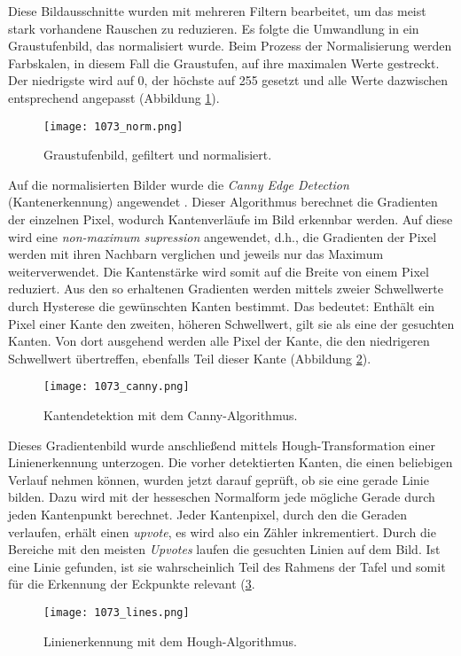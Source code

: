 Diese Bildausschnitte wurden mit mehreren Filtern bearbeitet, um das meist stark vorhandene Rauschen zu reduzieren. Es folgte die Umwandlung in ein Graustufenbild, das normalisiert wurde. Beim Prozess der Normalisierung werden Farbskalen, in diesem Fall die Graustufen, auf ihre maximalen Werte gestreckt. Der niedrigste wird auf 0, der höchste auf 255 gesetzt und alle Werte dazwischen entsprechend angepasst (Abbildung \ref{fig:norm}).

\begin{figure}[h!]
\centering
\texttt{[image: 1073\_norm.png]}
\caption{Graustufenbild, gefiltert und normalisiert.}
\label{fig:norm}
\end{figure}

Auf die normalisierten Bilder wurde die \textit{Canny Edge Detection} (Kantenerkennung) angewendet \cite{cannyedge}. Dieser Algorithmus berechnet die Gradienten der einzelnen Pixel, wodurch Kantenverläufe im Bild erkennbar werden. Auf diese wird eine \textit{non-maximum supression} angewendet, d.h., die Gradienten der Pixel werden mit ihren Nachbarn verglichen und jeweils nur das Maximum weiterverwendet. Die Kantenstärke wird somit auf die Breite von einem Pixel reduziert. Aus den so erhaltenen Gradienten werden mittels zweier Schwellwerte durch Hysterese die gewünschten Kanten bestimmt. Das bedeutet:  Enthält ein Pixel einer Kante den zweiten, höheren Schwellwert, gilt sie als eine der gesuchten Kanten. Von dort ausgehend werden alle Pixel der Kante, die den niedrigeren Schwellwert übertreffen, ebenfalls Teil dieser Kante (Abbildung \ref{fig:canny}).
\begin{figure}[h!]
\centering
\texttt{[image: 1073\_canny.png]}
\caption{Kantendetektion mit dem Canny-Algorithmus.}
\label{fig:canny}
\end{figure}

Dieses Gradientenbild wurde anschließend mittels Hough-Transformation \cite{houghpatent}{} einer Linienerkennung unterzogen. Die vorher detektierten Kanten, die einen beliebigen Verlauf nehmen können, wurden jetzt darauf geprüft, ob sie eine gerade Linie bilden. Dazu wird mit der hesseschen Normalform jede mögliche Gerade durch jeden Kantenpunkt berechnet. Jeder Kantenpixel, durch den die Geraden verlaufen, erhält einen \textit{upvote}, es wird also ein Zähler inkrementiert. Durch die Bereiche mit den meisten \textit{Upvotes} laufen die gesuchten Linien auf dem Bild. Ist eine Linie gefunden, ist sie wahrscheinlich Teil des Rahmens der Tafel und somit für die Erkennung der Eckpunkte relevant (\ref{fig:lines}.
\begin{figure}[h!]
\centering
\texttt{[image: 1073\_lines.png]}
\caption{Linienerkennung mit dem Hough-Algorithmus.}
\label{fig:lines}
\end{figure}

